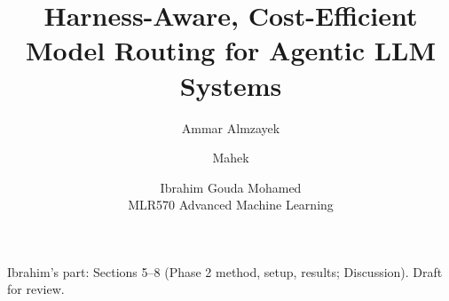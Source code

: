 \documentclass[10pt,twocolumn]{article}
\title{Harness-Aware, Cost-Efficient Model Routing for Agentic LLM Systems}
\author{Ammar Almzayek \and Mahek \and Ibrahim Gouda Mohamed\\
MLR570 Advanced Machine Learning}
\date{}
\begin{document}
\maketitle
\begin{center}\small Ibrahim's part: Sections 5--8 (Phase 2 method, setup, results; Discussion). Draft for review.\end{center}
\setcounter{section}{4}




\appendix



\end{document}
